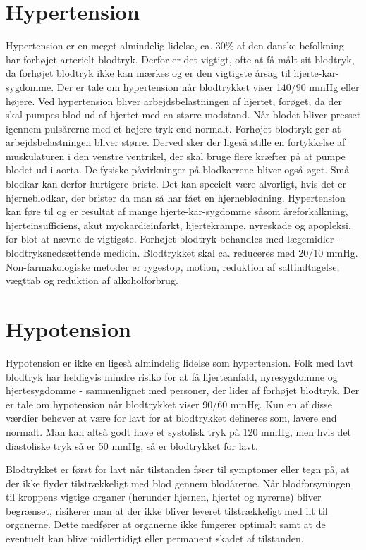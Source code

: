 \section{Hypertension} 
Hypertension er en meget almindelig lidelse, ca. 30\% af den danske befolkning har forhøjet arterielt blodtryk. Derfor er det vigtigt, ofte at få målt sit blodtryk, da forhøjet blodtryk ikke kan mærkes og er den vigtigste årsag til hjerte-kar-sygdomme. 
Der er tale om hypertension når blodtrykket viser 140/90 mmHg eller højere.
Ved hypertension bliver arbejdsbelastningen af hjertet, forøget, da der skal pumpes blod ud af hjertet med en større modstand. Når blodet bliver presset igennem pulsårerne med et højere tryk end normalt. 
Forhøjet blodtryk gør at arbejdsbelastningen bliver større. Derved sker der ligeså stille en fortykkelse af muskulaturen i den venstre ventrikel, der skal bruge flere kræfter på at pumpe blodet ud i aorta. 
De fysiske påvirkninger på blodkarrene bliver også øget. Små blodkar kan derfor hurtigere briste. Det kan specielt være alvorligt, hvis det er hjerneblodkar, der brister da man så har fået en hjerneblødning. 
Hypertension kan føre til og er resultat af mange hjerte-kar-sygdomme såsom åreforkalkning, hjerteinsufficiens, akut myokardieinfarkt, hjertekrampe, nyreskade og apopleksi, for blot at nævne de vigtigste. 
Forhøjet blodtryk behandles med lægemidler - blodtryksnedsættende medicin. Blodtrykket skal ca. reduceres med 20/10 mmHg. Non-farmakologiske metoder er rygestop, motion, reduktion af saltindtagelse, vægttab og reduktion af alkoholforbrug. 

\section{Hypotension} 
Hypotension er ikke en ligeså almindelig lidelse som hypertension. Folk med lavt blodtryk har heldigvis mindre risiko for at få hjerteanfald, nyresygdomme og hjertesygdomme - sammenlignet med personer, der lider af forhøjet blodtryk.
Der er tale om hypotension når blodtrykket viser 90/60 mmHg. Kun en af disse værdier behøver at være for lavt for at blodtrykket defineres som, lavere end normalt. Man kan altså godt have et systolisk tryk på 120 mmHg, men hvis det diastoliske tryk så er 50 mmHg, så er blodtrykket for lavt.  



Blodtrykket er først for lavt når tilstanden fører til symptomer eller tegn på, at der ikke flyder tilstrækkeligt med blod gennem blodårerne. Når blodforsyningen til kroppens vigtige organer (herunder hjernen, hjertet og nyrerne) bliver begrænset, risikerer man at der ikke bliver leveret tilstrækkeligt med ilt til organerne. Dette medfører at organerne ikke fungerer optimalt samt at de eventuelt kan blive midlertidigt eller permanent skadet af tilstanden.

